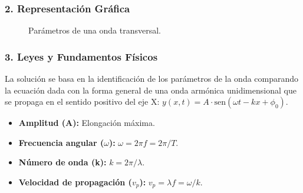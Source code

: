 \subsubsection*{2. Representación Gráfica}
\begin{figure}[H]
    \centering
    \caption{Parámetros de una onda transversal.}
\end{figure}

\subsubsection*{3. Leyes y Fundamentos Físicos}
La solución se basa en la identificación de los parámetros de la onda comparando la ecuación dada con la forma general de una onda armónica unidimensional que se propaga en el sentido positivo del eje X: $y(x,t) = A \cdot \text{sen}(\omega t - kx + \phi_0)$.
\begin{itemize}
    \item \textbf{Amplitud (A):} Elongación máxima.
    \item \textbf{Frecuencia angular ($\omega$):} $\omega = 2\pi f = 2\pi/T$.
    \item \textbf{Número de onda (k):} $k = 2\pi/\lambda$.
    \item \textbf{Velocidad de propagación ($v_p$):} $v_p = \lambda f = \omega/k$.
\end{itemize}

